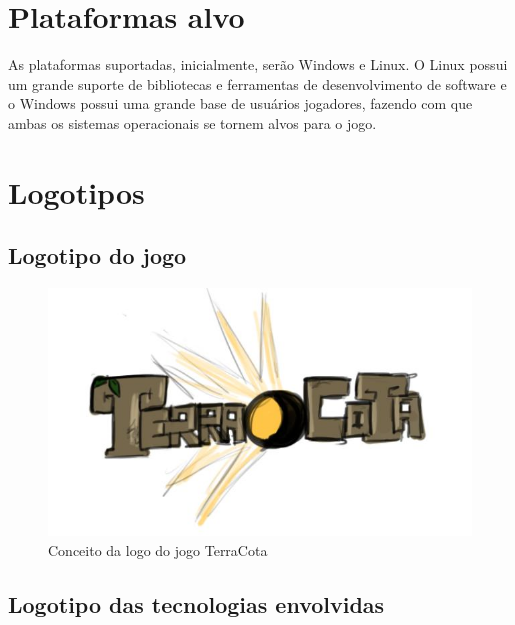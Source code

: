\documentclass[11pt]{article}
\begin{document}
\section{Plataformas alvo}
As plataformas suportadas, inicialmente, serão Windows e Linux.
O Linux possui um grande suporte de bibliotecas e ferramentas de desenvolvimento de software e o Windows possui uma grande base de usuários jogadores, fazendo com que ambas os sistemas operacionais se tornem alvos para o jogo.


\section{Logotipos}
\subsection{Logotipo do jogo}
\begin{figure}[!htp]
\centering
\includegraphics[scale=0.5]{logo-terracota.jpg}
\caption{Conceito da logo do jogo TerraCota}
\label{TerraCota logo}
\end{figure}

\subsection{Logotipo das tecnologias envolvidas}
\end{document}
